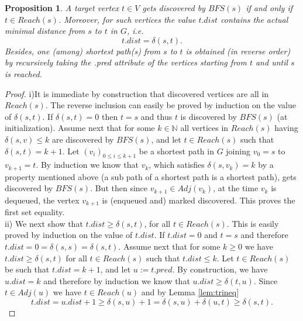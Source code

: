 \documentclass[12pt]{article}
\theoremstyle{plain}
\newtheorem{proposition}{Proposition}
\theoremstyle{remark}
\newcommand{\N}{\mathbb{N}}
\begin{document}
\begin{proposition}\label{prop:shortest}
	A target vertex $t \in V$ gets discovered by $BFS(s)$ if and only if $t \in
	Reach(s)$. Moreover, for such vertices the value $t.dist$ contains the actual
	minimal distance from $s$ to $t$ in $G$, i.e.
	$$
	t.dist = \delta(s,t).
	$$
	Besides, one (among) shortest path(s) from $s$ to $t$ is 
	obtained (in reverse order) by recursively taking the .pred 
	attribute of the vertices starting from $t$ and until $s$ is reached.
\end{proposition}
\begin{proof}
	i)It is immediate by construction that discovered vertices are all in
	$Reach(s)$. The reverse inclusion can easily be proved by induction on 
	the value of $\delta(s,t).$ If $\delta(s,t) = 0$ then $t = s$ and thus
	$t$ is discovered by $BFS(s)$ (at initialization). Assume next that for
	some $k \in \N$ all vertices in $Reach(s)$ having $\delta(s,v) \leq k$ 
	are discovered by $BFS(s)$, and let $t \in Reach(s)$ such that
	$\delta(s,t) = k+1$. Let $(v_i)_{0\leq i \leq k+1}$ be a shortest path
	in $G$ joining $v_0 = s$ to $v_{k+1} = t$. By induction we know that 
	$v_{k}$, which satisfies $\delta(s,v_k) = k$ by a property mentioned
	above (a sub path of a shortest path is a shortest path), gets 
	discovered by $BFS(s).$ But then since $v_{k+1} \in
	Adj(v_k)$, at the time $v_k$ is dequeued, the vertex $v_{k+1}$ is (enqueued and) 
	marked discovered. This proves the first set equality.\\

	ii) We next show that $t.dist \geq \delta(s,t)$, for all $t \in Reach(s).$
	This is easily proved by induction on the value of $t.dist$. If $t.dist
	= 0$ and $t = s$ and therefore $t.dist = 0 = \delta(s,s) = \delta(s,t).$ 
	Assume next that for some $k\geq 0$ we have $t.dist \geq \delta(s,t)$ for 
	all $t \in Reach(s)$ such that $t.dist \leq k$. Let $t \in Reach(s)$ 
	be such that $t.dist = k+1$, and let $u := t.pred$.
	By construction, we have $u.dist = k$ and therefore by induction we 
	know that $u.dist \geq \delta(t,u).$ Since $t \in Adj(u)$ we have $t \in
	Reach(u)$ and by Lemma \ref{lem:trineq}
	$$
	t.dist = u.dist + 1 \geq \delta(s,u) + 1 = \delta(s,u) + \delta(u,t)
	\geq \delta(s,t).
	$$


\end{proof}
\end{document}
